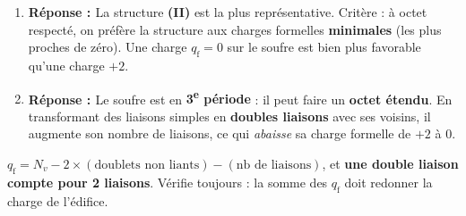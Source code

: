 \documentclass[11pt,a4paper]{article}
\newcommand{\rep}{\textbf{\textcolor{corcol}{Réponse : }}}
\begin{document}
\begin{cor}
\begin{enumerate}[label=\alph*),leftmargin=2em,itemsep=2pt]
  \item \rep La structure \textbf{(II)} est la plus représentative. Critère : à octet respecté, on
        préfère la structure aux charges formelles \textbf{minimales} (les plus proches de zéro).
        Une charge $q_{\mathrm{f}} = 0$ sur le soufre est bien plus favorable qu'une charge $+2$.
  \item \rep Le soufre est en \textbf{3\textsuperscript{e} période} : il peut faire un
        \textbf{octet étendu}. En transformant des liaisons simples en \textbf{doubles liaisons}
        avec ses voisins, il augmente son nombre de liaisons, ce qui \emph{abaisse} sa charge
        formelle de $+2$ à $0$.
\end{enumerate}
\end{cor}

\begin{astucebox}
$q_{\mathrm{f}} = N_v - 2\times(\text{doublets non liants}) - (\text{nb de liaisons})$, et
\textbf{une double liaison compte pour 2 liaisons}. Vérifie toujours : la somme des $q_{\mathrm{f}}$
doit redonner la charge de l'édifice.
\end{astucebox}
\end{document}
